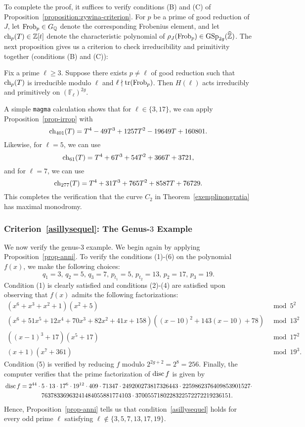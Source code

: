 To complete the proof, it suffices to verify conditions (B) and (C) of Proposition~\ref{proposition:zywina-criterion}.
For $p$ be a prime of good reduction of $J$, let $\operatorname{Frob}_p \in G_{\mathbb Q}$ denote the corresponding Frobenius element, and let $\operatorname{ch}_p(T) \in \mathbb Z[t]$ denote the characteristic polynomial of $\rho_J(\operatorname{Frob}_p) \in \operatorname{GSp}_{2g}(\widehat{\mathbb Z})$. The next proposition gives us a criterion to check irreducibility and primitivity together (conditions (B) and (C)):

\begin{proposition}\label{prop-irrop}
	Fix a prime $\ell \ge 3$. Suppose there exists $p \neq \ell$ of good reduction such that $\operatorname{ch}_p(T)$ is irreducible modulo $\ell$ and $\ell \nmid \operatorname{tr}(\operatorname{Frob}_p)$. Then $H(\ell)$ acts irreducibly and primitively on $(\mathbb{F}_\ell)^{2g}$. 
\end{proposition}

A simple {\tt magma} calculation shows that for $\ell \in \{3,17\}$, we can apply Proposition~\ref{prop-irrop} with
$$\operatorname{ch}_{401}(T) = T^4 - 49T^3+1257T^2-19649T+160801.$$
Likewise, for $\ell = 5$, we can use 
$$\operatorname{ch}_{61}(T) = T^4 + 6T^3 + 54T^2 + 366T + 3721,$$
and for $\ell = 7$, we can use
$$\operatorname{ch}_{277}(T) = T^4 + 31T^3 + 765T^2 + 8587T + 76729.$$
This completes the verification that the curve $C_2$ in Theorem~\ref{exemplinongratia} has maximal monodromy.


\subsubsection{Criterion~\eqref{asillysequel}: The Genus-$3$ Example}

We now verify the genus-$3$ example. We begin again by applying Proposition~\ref{prop-anni}. To verify the conditions (1)-(6) on the polynomial $f(x)$, we make the following choices:
$$q_1 = 3, \,  q_2 = 5,\, q_3 = 7,\, p_{t_1} = 5,\, p_{t_2} = 13,\, p_2 = 17,\, p_3 = 19.$$ 
Condition (1) is clearly satisfied and
conditions (2)-(4) are satisfied upon observing that $f(x)$ admits the following factorizations:
\begin{align*}
( x^6 + x^3 + x^2 + 1 )( x^2 + 5 ) & \bmod 5^2 \\
	 (x^6 + 51x^5 + 12 x^4 + 70x^3 + 82x^2 + 41x + 158)((x-10)^2 + 143(x-10)+78)  & \bmod 13^2 \\
	((x-1)^3 + 17)(x^5 + 17) & \bmod 17^2 \\
	(x+1)(x^7 + 361) & \bmod 19^3.
\end{align*}
Condition (5) is verified by reducing $f$ modulo $2^{2g+2} = 2^8 = 256$.
Finally, the computer verifies that the prime factorization of $\operatorname{disc} f$ is given by
\begin{align*}
	& \operatorname{disc} f = 2^{44} \cdot 5 \cdot 13 \cdot 17^6 \cdot 19^{12} \cdot 409 \cdot 71347 \cdot 
249200273817326443 \cdot 2259862376409853901527 \cdot \\
& \qquad \qquad 
\qquad 76378336963241484055881774103 \cdot 3700557180228322572272219236151
.
	\end{align*}
Hence, Proposition~\ref{prop-anni} tells us that condition~\eqref{asillysequel} holds for every odd prime $\ell$ satisfying $\ell \not\in \{3,5,7,13,17,19\}$.

